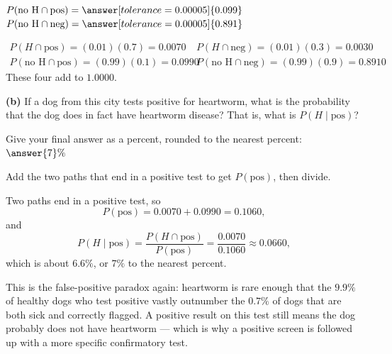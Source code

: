 \documentclass[12pt]{ximera}
\begin{document}
\begin{problem}
\begin{prompt}
\smallskip
$P(\text{no H}\cap\text{pos})=\answer[tolerance=0.00005]{0.099}$ \qquad
$P(\text{no H}\cap\text{neg})=\answer[tolerance=0.00005]{0.891}$

\begin{solution}
\[
\begin{array}{ll}
P(H\cap\text{pos})=(0.01)(0.7)=0.0070 &
P(H\cap\text{neg})=(0.01)(0.3)=0.0030\\[2pt]
P(\text{no H}\cap\text{pos})=(0.99)(0.1)=0.0990 &
P(\text{no H}\cap\text{neg})=(0.99)(0.9)=0.8910
\end{array}
\]
These four add to $1.0000$. \checkmark
\end{solution}
\end{prompt}

\begin{prompt}
\textbf{(b)} If a dog from this city tests positive for heartworm, what is the
probability that the dog does in fact have heartworm disease? That is, what is
$P(H\mid \text{pos})$?

Give your final answer as a percent, rounded to the nearest percent:
$\answer{7}\%$

\begin{hint}
Add the two paths that end in a positive test to get $P(\text{pos})$, then divide.
\end{hint}

\begin{solution}
Two paths end in a positive test, so
\[
P(\text{pos}) = 0.0070 + 0.0990 = 0.1060,
\]
and
\[
P(H\mid\text{pos}) = \frac{P(H\cap\text{pos})}{P(\text{pos})}
= \frac{0.0070}{0.1060} \approx 0.0660,
\]
which is about $6.6\%$, or $7\%$ to the nearest percent.

This is the false-positive paradox again: heartworm is rare enough that the $9.9\%$
of healthy dogs who test positive vastly outnumber the $0.7\%$ of dogs that are both
sick and correctly flagged. A positive result on this test still means the dog
probably does not have heartworm --- which is why a positive screen is followed up
with a more specific confirmatory test.
\end{solution}
\end{prompt}
\end{problem}
\end{document}
